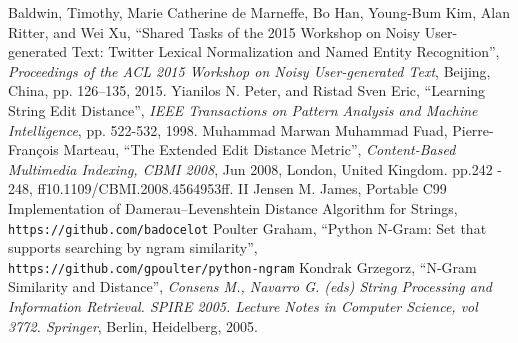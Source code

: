 \documentclass[11pt]{article}
\begin{document}
\begin{thebibliography}{100}
   Baldwin, Timothy, Marie Catherine de Marneffe, Bo Han, Young-Bum Kim, Alan Ritter,
and Wei Xu, ``Shared Tasks of the 2015 Workshop on Noisy User-generated Text:
Twitter Lexical Normalization and Named Entity Recognition'', \emph{Proceedings of the ACL
2015 Workshop on Noisy User-generated Text}, Beijing, China, pp. 126–135, 2015.
   Yianilos N. Peter, and Ristad Sven Eric, ``Learning String Edit Distance'', \emph{IEEE Transactions on Pattern Analysis and Machine Intelligence}, pp. 522-532, 1998.
   Muhammad Marwan Muhammad Fuad, Pierre-François Marteau, ``The Extended Edit Distance Metric'', \emph{Content-Based Multimedia Indexing, CBMI 2008}, Jun 2008, London, United Kingdom. pp.242 -
248, ff10.1109/CBMI.2008.4564953ff.
   II Jensen M. James, Portable C99 Implementation of Damerau–Levenshtein Distance Algorithm for Strings, \\\texttt{https://github.com/badocelot} 
   Poulter Graham, ``Python N-Gram: Set that supports searching by ngram similarity'', \texttt{https://github.com/gpoulter/python-ngram} 
   Kondrak Grzegorz, ``N-Gram Similarity and Distance'', \emph{Consens M., Navarro G. (eds) String Processing and Information Retrieval. SPIRE 2005. Lecture Notes in Computer Science, vol 3772. Springer}, Berlin, Heidelberg, 2005.
\end{thebibliography}
\end{document}

